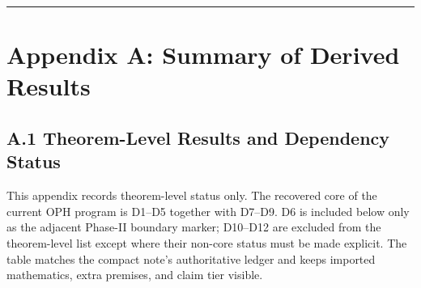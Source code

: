 \begin{center}\rule{0.5\linewidth}{0.5pt}\end{center}

\section{Appendix A: Summary of Derived Results}\label{appendix-a-summary-of-derived-results}

\subsection{A.1 Theorem-Level Results and Dependency Status}\label{a1-theorem-level-results}

This appendix records theorem-level status only. The recovered core of the current OPH program is D1--D5 together with D7--D9. D6 is included below only as the adjacent Phase-II boundary marker; D10--D12 are excluded from the theorem-level list except where their non-core status must be made explicit. The table matches the compact note's authoritative ledger and keeps imported mathematics, extra premises, and claim tier visible.

